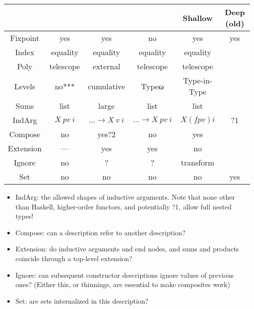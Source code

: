\begin{tabular}{c | c c c c c}
             & \cite{sijsling} & \cite{effectfully} & \cite{practgen} & Shallow   & Deep (old) \\
    \hline   
    Fixpoint & yes             & yes                & no              & yes       & yes     \\
    Index    & equality        & equality           & equality        & equality  &         \\
    Poly     & telescope       & external           & telescope       & telescope &         \\
    Levels   & no***           & cumulative         & Typeω           & Type-in-Type &         \\
    Sums     & list            & large              & list            & list      &         \\
    IndArg   & $X\ pv\ i$      & $\dots\to X\ v\ i$ & $\dots\to X\ pv\ i$ & $X (f pv) i$ & ?1 \\
    Compose  & no              & yes?2              & no              & yes       &         \\
    Extension& —               & yes                & yes             & no        &         \\
    Ignore   & no              & ?                  & ?               & transform &         \\
    Set      & no              & no                 & no              & no        & yes     \\
\end{tabular}



\begin{itemize}
    \item IndArg: the allowed shapes of inductive arguments. Note that none other than Haskell, higher-order functors, and potentially ?1, allow full nested types!
    \item Compose: can a description refer to another description?
    \item Extension: do inductive arguments and end nodes, and sums and products coincide through a top-level extension?
    \item Ignore: can subsequent constructor descriptions ignore values of previous ones? (Either this, or thinnings, are essential to make composites work)
    \item Set: are sets internalized in this description?
\end{itemize}

